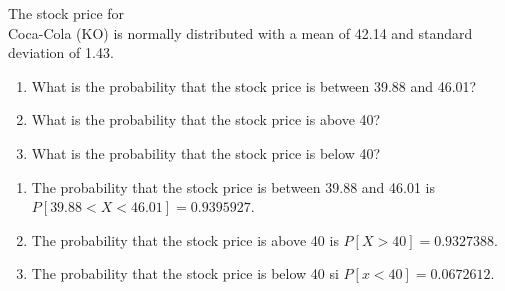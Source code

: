 \documentclass[11pt, chapterprefix=true]{scrbook}\usepackage[]{graphicx}\usepackage[]{color}
\begin{document}
\begin{exercises}
\begin{exercise}
	\end{exercise}
%
 
  \begin{exercise}	%

The stock price for \\ Coca-Cola (KO) is normally distributed with a mean of 42.14 and standard deviation of 1.43.

\begin{enumerate}
\item What is the probability that the stock price is between 39.88 and 46.01?
\item What is the probability that the stock price is above 40?
\item What is the probability that the stock price is below 40?
\end{enumerate}

  \end{exercise}
\begin{solution}  %


\begin{enumerate}
\item The probability that the stock price is between 39.88 and 46.01 is $P[39.88 < X < 46.01] = 0.9395927$.
\item The probability that the stock price is above 40 is $P[X > 40] = 0.9327388$.
\item The probability that the stock price is below 40 si $P[ x < 40] = 0.0672612$.
\end{enumerate}
\end{solution}


\end{exercises}
\end{document}

